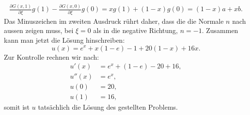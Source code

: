 \begin{loesung}
\begin{align*}
\frac{\partial G(x,1)}{\partial\xi} g(1)
-
\frac{\partial G(x,0)}{\partial\xi} g(0)
=
xg(1) + (1-x)g(0)
=
(1-x)a
+
xb.
\end{align*}
Das Minuszeichen im zweiten Ausdruck rührt daher, dass die die Normale $n$
nach aussen zeigen muss, bei $\xi=0$ als in die negative Richtung, $n=-1$.
Zusammen kann man jetzt die Lösung hinschreiben:
\[
u(x)
=
e^x+x(1-e)-1
+20(1-x)+16x.
\]
Zur Kontrolle rechnen wir nach:
\begin{align*}
u'(x)
&=
e^x+(1-e)-20+16,
\\
u''(x)
&=
e^x,
\\
u(0)
&=
20,
\\
u(1)
&=
16,
\end{align*}
somit ist $u$ tatsächlich die Lösung des gestellten Problems.
\end{loesung}

